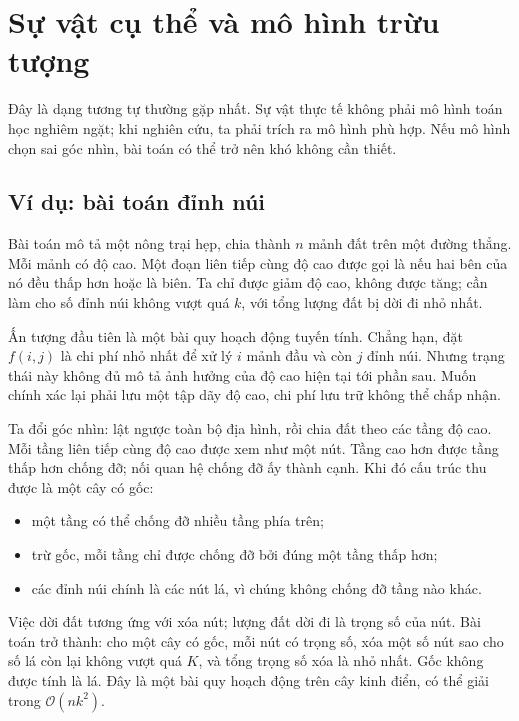 \documentclass[11pt]{article}
\newcommand{\Oh}{\mathcal{O}}
\begin{document}
\section{Sự vật cụ thể và mô hình trừu tượng}

Đây là dạng tương tự thường gặp nhất. Sự vật thực tế không phải mô hình toán
học nghiêm ngặt; khi nghiên cứu, ta phải trích ra mô hình phù hợp. Nếu mô hình
chọn sai góc nhìn, bài toán có thể trở nên khó không cần thiết.

\subsection{Ví dụ: bài toán đỉnh núi}

Bài toán mô tả một nông trại hẹp, chia thành \(n\) mảnh đất trên một đường
thẳng. Mỗi mảnh có độ cao. Một đoạn liên tiếp cùng độ cao được gọi là
 nếu hai bên của nó đều thấp hơn hoặc là biên. Ta chỉ được giảm
độ cao, không được tăng; cần làm cho số đỉnh núi không vượt quá \(k\), với
tổng lượng đất bị dời đi nhỏ nhất.

Ấn tượng đầu tiên là một bài quy hoạch động tuyến tính. Chẳng hạn, đặt
\(f(i,j)\) là chi phí nhỏ nhất để xử lý \(i\) mảnh đầu và còn \(j\) đỉnh núi.
Nhưng trạng thái này không đủ mô tả ảnh hưởng của độ cao hiện tại tới phần
sau. Muốn chính xác lại phải lưu một tập dãy độ cao, chi phí lưu trữ không thể
chấp nhận.

Ta đổi góc nhìn: lật ngược toàn bộ địa hình, rồi chia đất theo các tầng độ
cao. Mỗi tầng liên tiếp cùng độ cao được xem như một nút. Tầng cao hơn được
tầng thấp hơn chống đỡ; nối quan hệ chống đỡ ấy thành cạnh. Khi đó cấu trúc
thu được là một cây có gốc:
\begin{itemize}
  \item một tầng có thể chống đỡ nhiều tầng phía trên;
  \item trừ gốc, mỗi tầng chỉ được chống đỡ bởi đúng một tầng thấp hơn;
  \item các đỉnh núi chính là các nút lá, vì chúng không chống đỡ tầng nào
  khác.
\end{itemize}

Việc dời đất tương ứng với xóa nút; lượng đất dời đi là trọng số của nút. Bài
toán trở thành: cho một cây có gốc, mỗi nút có trọng số, xóa một số nút sao
cho số lá còn lại không vượt quá \(K\), và tổng trọng số xóa là nhỏ nhất. Gốc
không được tính là lá. Đây là một bài quy hoạch động trên cây kinh điển, có
thể giải trong \(\Oh(nk^2)\).
\end{document}

